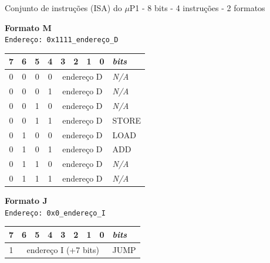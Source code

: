 \documentclass[aspectratio=169]{beamer}
\begin{document}
\begin{frame}{Conjunto de instruções (ISA) do $\mu$P1 - 8 bits - 4 instruções - 2 formatos}
    \begin{multicols}{2}
        \textbf{Formato M} \\
        \texttt{Endereço: 0x1111\_endereço\_D}
    \begin{tabular}{|c|c|c|c|c|c|c|c|l|}
        \hline
         7 & 6 & 5 & 4 & 3 & 2 & 1 & 0 & \textit{bits} \\
         \hline
         \hline
        0 & 0 & 0 & 0 & \multicolumn{4}{c|}{endereço D} & \textit{N/A} \\
        0 & 0 & 0 & 1 & \multicolumn{4}{c|}{endereço D} & \textit{N/A} \\
        0 & 0 & 1 & 0 & \multicolumn{4}{c|}{endereço D} & \textit{N/A} \\
        0 & 0 & 1 & 1 & \multicolumn{4}{c|}{endereço D} & STORE \\
        0 & 1 & 0 & 0 & \multicolumn{4}{c|}{endereço D} & LOAD \\
        0 & 1 & 0 & 1 & \multicolumn{4}{c|}{endereço D} & ADD  \\
        0 & 1 & 1 & 0 & \multicolumn{4}{c|}{endereço D} & \textit{N/A} \\
        0 & 1 & 1 & 1 & \multicolumn{4}{c|}{endereço D} & \textit{N/A} \\
        \hline
    \end{tabular}
        \textbf{Formato J} \\
        \texttt{Endereço: 0x0\_endereço\_I}
    \begin{tabular}{|c|c|c|c|c|c|c|c|l|}
        \hline
        7 & 6 & 5 & 4 & 3 & 2 & 1 & 0 & \textit{bits} \\
         \hline
        \hline
        \multirow{8}{*}{1} & \multicolumn{7}{c|}{\multirow{8}{*}{endereço I (+7 bits)}} & \multirow{8}{*}{JUMP} \\
         & \multicolumn{7}{c|}{} & \\
         & \multicolumn{7}{c|}{} & \\
         & \multicolumn{7}{c|}{} & \\
         & \multicolumn{7}{c|}{} & \\
         & \multicolumn{7}{c|}{} & \\
         & \multicolumn{7}{c|}{} & \\
         & \multicolumn{7}{c|}{} & \\
        \hline
    \end{tabular}   
    \vfill\null
    \end{multicols}
\end{frame}
\end{document}
